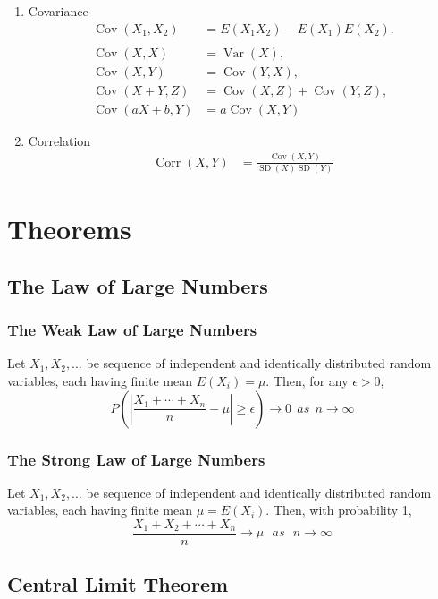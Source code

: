 \documentclass{amsproc}
\DeclareMathOperator{\Var}{\text{Var}}
\DeclareMathOperator{\SD}{\text{SD}}
\DeclareMathOperator{\Cov}{\text{Cov}}
\DeclareMathOperator{\Corr}{\text{Corr}}
\begin{document}
\begin{enumerate}
				\item Covariance
					\begin{align*}
						\Cov(X_{1}, X_{2}) &= E(X_{1}X_{2}) - E(X_{1})E(X_{2}). \\
						\\
						\Cov(X, X) &= \Var(X), \\
						\Cov(X, Y) &= \Cov(Y, X), \\
						\Cov(X + Y, Z) &= \Cov(X, Z) + \Cov(Y, Z), \\
						\Cov(aX + b, Y) &= a\Cov(X,Y)
					\end{align*}

				\item Correlation
					\begin{align*}
						\Corr(X,Y) &= \frac{\Cov(X,Y)}{\SD(X)\SD(Y)}
					\end{align*}
			\end{enumerate}

	\section{Theorems}
		\subsection{The Law of Large Numbers}
			\subsubsection{The Weak Law of Large Numbers} Let $X_{1}, X_{2}, \dots$ be sequence of independent and identically distributed random variables, each having finite mean $E\left(X_{i}\right) = \mu$. Then, for any $\epsilon > 0$, \[P\left(\left|\frac{X_{1} + \cdots + X_{n}}{n} - \mu\right| \geq \epsilon \right) \rightarrow 0 \ \ as \ \ n \rightarrow \infty\]

			\subsubsection{The Strong Law of Large Numbers} Let $X_{1}, X_{2}, \dots$ be sequence of independent and identically distributed random variables, each having finite mean $\mu = E\left(X_{i}\right)$. Then, with probability 1, \[\frac{X_{1} + X_{2} + \cdots + X_{n}}{n} \rightarrow \mu \ \ \ as \ \ \ n \rightarrow \infty \]

		\subsection{Central Limit Theorem}
\end{document}
